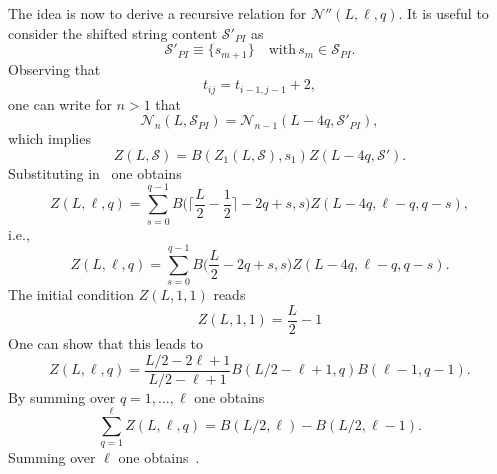\documentclass[11pt]{iopart}
\begin{document}
The idea is now to derive a recursive relation for ${\mathcal N}''(L,\ell,q)$. 
It is useful to consider the shifted string content ${\mathcal S}'_{PI}$ as  
%
\begin{equation}
{\mathcal S}'_{PI}\equiv \{s_{m+1}\}\quad\textrm{with}\, s_m\in{\mathcal S}_{PI}.
\end{equation}
%
Observing that 
%
\begin{equation}
t_{ij}=t_{i-1,j-1}+2,
\end{equation}
%
one can write for $n>1$ that 
%
%
%
\begin{equation}
{\mathcal N}_n(L,{\mathcal S}_{PI})={\mathcal N}_{n-1}(L-4q,{\mathcal S}'_{PI}),
\end{equation}
%
which implies
%
\begin{equation}
Z(L,{\mathcal S})=B(Z_1(L,{\mathcal S}),s_1)Z(L-4q,{\mathcal S}').
\end{equation}
%
Substituting in~ one obtains
%
\begin{equation}
Z(L,\ell,q)=\sum_{s=0}^{q-1}B\Big(\Big\lceil\frac{L}{2}-\frac{1}{2}\Big
\rceil-2q+s,s\Big)Z(L-4q,\ell-q,q-s),
\end{equation}
%
i.e.,
%
\begin{equation}
Z(L,\ell,q)=\sum_{s=0}^{q-1}B\Big(\frac{L}{2}-2q+s,s\Big)Z(L-4q,\ell-q,q-s).
\end{equation}
%
The initial condition $Z(L,1,1)$ reads 
%
\begin{equation}
Z(L,1,1)=\frac{L}{2}-1
\end{equation}
%
One can show that this leads to 
%
\begin{equation}
Z(L,\ell,q)=\frac{L/2-2\ell+1}{L/2-\ell+1}B(L/2-\ell+1,q)B(\ell-1,q-1).
\end{equation}
%
By summing over $q=1,\dots,\ell$ one obtains 
%
\begin{equation}
\sum\limits_{q=1}^\ell Z(L,\ell,q)=B(L/2,\ell)-B(L/2,\ell-1).
\end{equation}
%
Summing over $\ell$ one obtains~.
\end{document}
